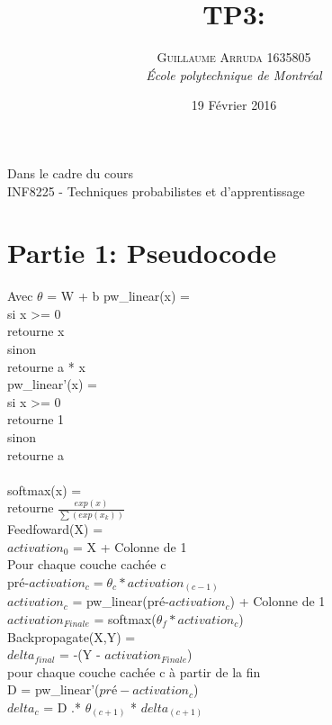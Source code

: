 \documentclass[a4paper, 12pt]{article} %
\title{TP3: }
\author{\textsc{Guillaume Arruda 1635805} %
\vspace{10pt}
\\{\textit{École polytechnique de Montréal}}} %
\date{19 Février 2016} %
\makeatletter
\newcommand\tab[1][1cm]{\hspace*{#1}}
\renewcommand{\maketitle}{ %
\begin{center} %

\vspace*{25pt} %
{\LARGE\@title} %

\vspace{125pt} %

{\large\@author} %

\vspace{125pt} %
Dans le cadre du cours
\\INF8225 - Techniques probabilistes et d'apprentissage
\vspace{125pt} %
\\\@date %
\vspace{125pt} %

\end{center}
}
\makeatother
\begin{document}
\thispagestyle{empty}
\clearpage\maketitle %
\pagebreak[4]

\setlength{\headheight}{15.0pt}
\pagestyle{fancy}
\fancyhead[C]{}

\section*{Partie 1: Pseudocode}
Avec $\theta$ = W + b
pw\_linear(x) =\\
\tab    si x >= 0 \\
\tab\tab    retourne x \\
\tab	sinon \\
\tab\tab	retourne a * x \\

pw\_linear'(x) =\\
\tab	si x >= 0 \\
\tab\tab		retourne 1 \\
\tab	sinon \\
\tab\tab	retourne a \\
\\
softmax(x) = \\
\tab	retourne $\frac{exp(x)}{\sum{(exp(x_k))}}$ \\

Feedfoward(X) = \\
\tab	$activation_{0}$ = X + Colonne de 1 \\
\tab	Pour chaque couche cachée c \\
\tab\tab	pré-$activation_{c} = \theta_c * activation_{(c-1)}$ \\
\tab\tab	$activation_{c}$ = pw\_linear(pré-$activation_{c}$) + Colonne de 1 \\
\tab	$activation_{Finale}$ = softmax($\theta_{f} * activation_{c}$) \\

Backpropagate(X,Y) = \\
\tab	$delta_{final}$ = -(Y - $activation_{Finale}$) \\
\tab	pour chaque couche cachée c à partir de la fin \\
\tab\tab	D = pw\_linear'($pré-activation_{c}$) \\
\tab\tab	$delta_{c}$ = D .* $\theta_{(c+1)}$ * $delta_{(c+1)}$ \\ 
		
\end{document}

